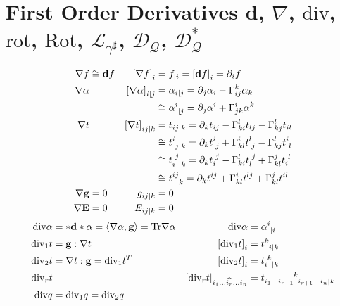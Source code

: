 \documentclass[a4paper,10pt]{scrartcl}
\newcommand{\exd}{\mathbf{d}}
\newcommand{\Tr}{\mathrm{Tr}}
\newcommand{\rot}{\mathrm{rot}}
\renewcommand{\div}{\mathrm{div}}
\newcommand{\Rot}{\mathrm{Rot}}
\newcommand{\lie}{\mathcal{L}}
\newcommand{\dq}{\mathcal{D}_{\mathcal{Q}}}
\newcommand{\gb}{\mathbf{g}}
\newcommand{\Eb}{\mathbf{E}}
\begin{document}
\section{First Order Derivatives \( \exd \), \( \nabla \), \( \div \), \( \rot \), \( \Rot \), \( \lie_{\gamma^{\sharp}} \), \( \dq \), \( \dq^{*} \)}
\begin{align*}
  \nabla f &\cong \exd f 
          & \left[ \nabla f \right]_{i} &= f_{|i} = \left[ \exd f \right]_{i} = \partial_{i}f \\
  \nabla \alpha &
          & \left[ \nabla \alpha \right]_{i|j} &= \alpha_{i|j} = \partial_{j}\alpha_{i} - \Gamma^{k}_{ij}\alpha_{k} \\
          &&&\cong \tensor{\alpha}{^{i}_{|j}} = \partial_{j}\alpha^{i} + \Gamma^{i}_{jk}\alpha^{k}\\
  \nabla t &
          & \left[ \nabla t \right]_{ij|k} &= t_{ij|k} = \partial_{k}t_{ij} - \Gamma^{l}_{ki}t_{lj} - \Gamma^{l}_{kj}t_{il} \\
                       &&&\cong \tensor{t}{^{i}_{j|k}} = \partial_{k}\tensor{t}{^{i}_{j}} + \Gamma^{i}_{kl}\tensor{t}{^{l}_{j}} - \Gamma^{l}_{kj}\tensor{t}{^{i}_{l}}\\
                    &&&\cong \tensor{t}{_{i}^{j}_{|k}} = \partial_{k}\tensor{t}{_{i}^{j}} - \Gamma^{l}_{ki}\tensor{t}{_{l}^{j}} + \Gamma^{j}_{kl}\tensor{t}{_{i}^{l}}\\
                       &&&\cong\tensor{t}{^{ij}_{k}}   = \partial_{k}t^{ij} + \Gamma^{i}_{kl}t^{lj} + \Gamma^{j}_{kl}t^{il}\\
  \nabla \gb &= 0 & g_{ij|k} &= 0\\
  \nabla \Eb &= 0 & E_{ij|k} &= 0
\end{align*}
\begin{align*}
  \div\alpha &= *\exd * \alpha = \left\langle \nabla\alpha, \gb \right\rangle = \Tr\nabla\alpha
          &\div\alpha &= \tensor{\alpha}{^{i}_{|i}} \\
  \div_{1}t &= \gb:\nabla t
          & \left[ \div_{1}t \right]_{i} &= \tensor{t}{^{k}_{i|k}}\\
  \div_{2}t &= \nabla t :\gb = \div_{1}t^{T}
          & \left[ \div_{2}t \right]_{i} &= \tensor{t}{_{i}^{k}_{|k}}\\
  \div_{r}t &
          & \left[ \div_{r}t \right]_{i_{1}\ldots \widehat{i_{r}} \ldots i_{n}} &=\tensor{t}{_{i_{1}\ldots i_{r-1}}^{k}_{i_{r+1}\ldots i_{n}|k}} \\
  \div q &= \div_{1}q = \div_{2}q
\end{align*}
\end{document}
